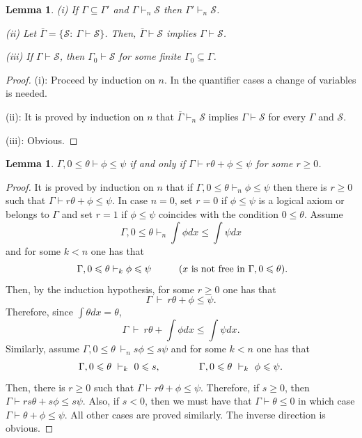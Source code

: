 \documentclass[12pt]{article}
\newtheorem{lemma}[theorem]{Lemma}
\def\Sc{\mathcal S}
\begin{document}
\begin{lemma} \label{deduction1}
(i) If $\Gamma\subseteq\Gamma'$ and $\Gamma\vdash_n\Sc$ then $\Gamma'\vdash_n\Sc$.

(ii) Let $\bar\Gamma=\{\Sc:\ \Gamma\vdash\Sc\}$. Then, $\bar\Gamma\vdash\Sc$ implies $\Gamma\vdash\Sc$.

(iii) If $\Gamma\vdash\Sc$, then $\Gamma_0\vdash\Sc$ for some finite $\Gamma_0\subseteq\Gamma$.
\end{lemma}
\begin{proof}
(i): Proceed by induction on $n$. In the quantifier cases a change of variables is needed.

(ii): It is proved by induction on $n$ that $\bar\Gamma\vdash_n\Sc$ implies $\Gamma\vdash\Sc$ for every $\Gamma$ and $\Sc$.

(iii): Obvious.
\end{proof}

\begin{lemma}
$\Gamma,0\leqslant\theta\vdash\phi\leqslant\psi$ if and only if $\Gamma\vdash r\theta+\phi\leqslant\psi$ for some $r\geqslant0$.
\end{lemma}
\begin{proof}
It is proved by induction on $n$ that if $\Gamma,0\leqslant\theta\vdash_n\phi\leqslant\psi$
then there is $r\geqslant0$ such that $\Gamma\vdash r\theta+\phi\leqslant \psi$.
In case $n=0$, set $r=0$ if $\phi\leqslant\psi$ is a logical axiom or belongs to $\Gamma$ and set $r=1$ if
$\phi\leqslant\psi$ coincides with the condition $0\leqslant\theta$.
Assume $$\Gamma,0\leqslant\theta\vdash_n\int\phi dx\leqslant\int\psi dx$$
and for some $k<n$ one has that
$$\ \Gamma,0\leqslant\theta\vdash_k\phi\leqslant\psi\hspace{10mm} (x\ \textrm{is not free in}\ \Gamma,0\leqslant\theta).$$
Then, by the induction hypothesis, for some $r\geqslant0$ one has that
$$\Gamma\ \vdash\ r\theta+\phi\leqslant\psi.$$
Therefore, since $\int\theta dx=\theta$, $$\Gamma\ \vdash\ r\theta+\int\phi dx\leqslant\int\psi dx.$$
Similarly, assume $\Gamma,0\leqslant\theta\ \vdash_n s\phi\leqslant s\psi$ and for some $k<n$ one has that
$$\Gamma,0\leqslant\theta\ \vdash_k\ 0\leqslant s,\hspace{14mm}\Gamma,0\leqslant\theta\ \vdash_k\ \phi\leqslant\psi.$$
Then, there is $r\geqslant0$ such that $\Gamma\vdash r\theta+\phi\leqslant\psi$. Therefore, if $s\geqslant0$,
then $\Gamma\vdash rs\theta+s\phi\leqslant s\psi$. Also, if $s<0$, then we must have that
$\Gamma\vdash\theta\leqslant0$ in which case $\Gamma\vdash\theta+\phi\leqslant\psi$.
All other cases are proved similarly. The inverse direction is obvious.
\end{proof}
\end{document}
